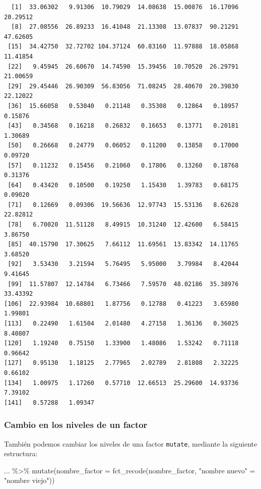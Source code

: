 \documentclass[
  letterpaper,
  DIV=11,
  numbers=noendperiod]{scrartcl}
\newenvironment{Shaded}{\begin{snugshade}}{\end{snugshade}}
\newcommand{\AttributeTok}[1]{\textcolor[rgb]{0.40,0.45,0.13}{#1}}
\newcommand{\FunctionTok}[1]{\textcolor[rgb]{0.28,0.35,0.67}{#1}}
\newcommand{\NormalTok}[1]{\textcolor[rgb]{0.00,0.23,0.31}{#1}}
\newcommand{\OtherTok}[1]{\textcolor[rgb]{0.00,0.23,0.31}{#1}}
\newcommand{\SpecialCharTok}[1]{\textcolor[rgb]{0.37,0.37,0.37}{#1}}
\newcommand{\StringTok}[1]{\textcolor[rgb]{0.13,0.47,0.30}{#1}}
\begin{document}
\begin{verbatim}
  [1]  33.06302   9.91306  10.79029  14.08638  15.00876  16.17096  20.29512
  [8]  27.08556  26.89233  16.41048  21.13308  13.07837  90.21291  47.62605
 [15]  34.42750  32.72702 104.37124  60.83160  11.97888  18.05868  11.41854
 [22]   9.45945  26.60670  14.74590  15.39456  10.70520  26.29791  21.00659
 [29]  29.45446  26.90309  56.83056  71.08245  28.40670  20.39830  22.12022
 [36]  15.66058   0.53040   0.21148   0.35308   0.12864   0.18957   0.15876
 [43]   0.34568   0.16218   0.26832   0.16653   0.13771   0.20181   1.30689
 [50]   0.26668   0.24779   0.06052   0.11200   0.13858   0.17000   0.09720
 [57]   0.11232   0.15456   0.21060   0.17806   0.13260   0.18768   0.31376
 [64]   0.43420   0.10500   0.19250   1.15430   1.39783   0.68175   0.09020
 [71]   0.12669   0.09306  19.56636  12.97743  15.53136   8.62628  22.82812
 [78]   6.70020  11.51128   8.49915  10.31240  12.42600   6.58415   3.86750
 [85]  40.15790  17.30625   7.66112  11.69561  13.83342  14.11765   3.68520
 [92]   3.53430   3.21594   5.76495   5.95000   3.79984   8.42044   9.41645
 [99]  11.57807  12.14784   6.73466   7.59570  48.02186  35.38976  33.43392
[106]  22.93984  10.68801   1.87756   0.12788   0.41223   3.65980   1.99801
[113]   0.22490   1.61504   2.01480   4.27158   1.36136   0.36025   8.40807
[120]   1.19240   0.75150   1.33900   1.48086   1.53242   0.71118   0.96642
[127]   0.95130   1.18125   2.77965   2.02789   2.81808   2.32225   0.66102
[134]   1.00975   1.17260   0.57710  12.66513  25.29600  14.93736   7.39102
[141]   0.57288   1.09347
\end{verbatim}

\hypertarget{cambio-en-los-niveles-de-un-factor}{%
\subsubsection{Cambio en los niveles de un
factor}\label{cambio-en-los-niveles-de-un-factor}}

También podemos cambiar los niveles de una factor \texttt{mutate},
mediante la siguiente estructura:

\begin{Shaded}
\begin{Highlighting}[]
\NormalTok{... }\SpecialCharTok{\%\textgreater{}\%}
  \FunctionTok{mutate}\NormalTok{(}\AttributeTok{nombre\_factor =} \FunctionTok{fct\_recode}\NormalTok{(nombre\_factor,}
                        \StringTok{"nombre nuevo"} \OtherTok{=} \StringTok{"nombre viejo"}\NormalTok{))}
\end{Highlighting}
\end{Shaded}
\end{document}
